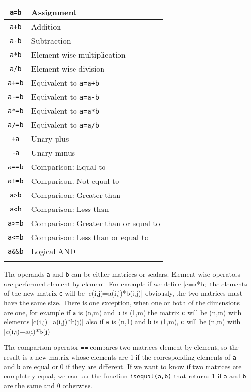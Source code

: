 \begin{tabular}{|c|l|}
\hline
\verb|a=b| & Assignment \\
\hline
\verb|a+b| & Addition \\
\hline
\verb|a-b| & Subtraction \\
\hline
\verb|a*b| & Element-wise multiplication \\
\hline
\verb|a/b| & Element-wise division \\
\hline
\verb|a+=b| & Equivalent to \verb|a=a+b| \\
\hline
\verb|a-=b| & Equivalent to \verb|a=a-b| \\
\hline
\verb|a*=b| & Equivalent to \verb|a=a*b| \\
\hline
\verb|a/=b| & Equivalent to \verb|a=a/b| \\
\hline
\verb|+a| & Unary plus \\
\hline
\verb|-a| & Unary minus \\
\hline
\verb|a==b| & Comparison: Equal to\\
\hline
\verb|a!=b| & Comparison: Not equal to\\
\hline
\verb|a>b| & Comparison: Greater than\\
\hline
\verb|a<b| & Comparison: Less than\\
\hline
\verb|a>=b| & Comparison: Greater than or equal to\\
\hline
\verb|a<=b| & Comparison: Less than or equal to\\
\hline
\verb|a&&b| & Logical AND\\
\hline
\verb%a||b% & Logical OR\\
\hline
\end{tabular}

\medskip

The operands {\tt a} and {\tt b} can be either matrices or scalars. Element-wise operators are 
performed element by element. For example if we define
|c=a*b;|
the elements of the new matrix {\tt c} will be
|c(i,j)=a(i,j)*b(i,j)|
obviously, the two matrices must have the same size. There is one exception, when one or both of the 
dimensions are one, for example if {\tt a} is (n,m) and {\tt b} is (1,m) the matrix {\tt c} will be
(n,m) with elements
|c(i,j)=a(i,j)*b(j)|
also if {\tt a} is (n,1) and {\tt b} is (1,m), {\tt c} will be
(n,m) with 
|c(i,j)=a(i)*b(j)|

The comparison operator {\tt ==} compares two matrices element by element, so the result is a new matrix
whose elements are 1 if the corresponding elements of {\tt a} and {\tt b} are equal or 0 if they 
are different. If we want to know if two matrices are completely equal, we can use the function
\verb|isequal(a,b)| that returns 1 if {\tt a} and {\tt b} are the same and 0 otherwise.

